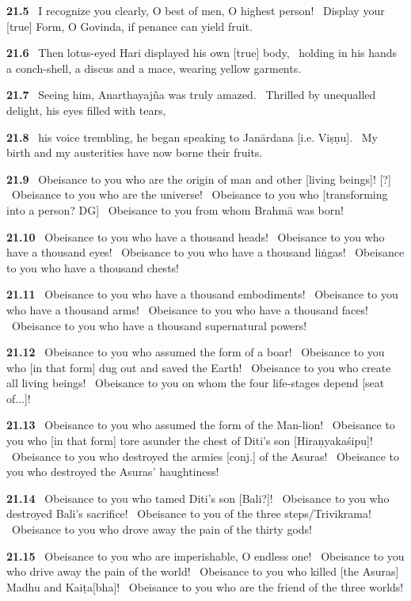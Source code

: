 \documentclass{article}
\begin{document}
\textbf{21.5}%
\ I recognize you clearly, O best of men, O highest person!%
\ Display your [true] Form, O Govinda, if penance can yield fruit.%


\textbf{21.6}%
\ Then lotus-eyed Hari displayed his own [true] body,%
\ holding in his hands a conch-shell, a discus and a mace, wearing yellow garments.%


\textbf{21.7}%
\ Seeing him, Anarthayajña was truly amazed.%
\ Thrilled by unequalled delight, his eyes filled with tears,%


\textbf{21.8}%
\ his voice trembling, he began speaking to Janārdana [i.e. Viṣṇu].%
\ My birth and my austerities have now borne their fruits.%


\textbf{21.9}%
\ Obeisance to you who are the origin of man and other [living beings]! [?]%
\ Obeisance to you who are the universe!%
\ Obeisance to you who [transforming into a person? DG]%
\ Obeisance to you from whom Brahmā was born!%


\textbf{21.10}%
\ Obeisance to you who have a thousand heads!%
\ Obeisance to you who have a thousand eyes!%
\ Obeisance to you who have a thousand liṅgas!%
\ Obeisance to you who have a thousand chests!%


\textbf{21.11}%
\ Obeisance to you who have a thousand embodiments!%
\ Obeisance to you who have a thousand arms!%
\ Obeisance to you who have a thousand faces!%
\ Obeisance to you who have a thousand supernatural powers!%


\textbf{21.12}%
\ Obeisance to you who assumed the form of a boar!%
\ Obeisance to you who [in that form] dug out and saved the Earth!%
\ Obeisance to you who create all living beings!%
\ Obeisance to you on whom the four life-stages depend [seat of...]!%


\textbf{21.13}%
\ Obeisance to you who assumed the form of the Man-lion!%
\ Obeisance to you who [in that form] tore asunder the chest of Diti's son [Hiraṇyakaśipu]!%
\ Obeisance to you who destroyed the armies [conj.] of the Asuras!%
\ Obeisance to you who destroyed the Asuras' haughtiness!%


\textbf{21.14}%
\ Obeisance to you who tamed Diti's son [Bali?]!%
\ Obeisance to you who destroyed Bali's sacrifice!%
\ Obeisance to you of the three steps/Trivikrama!%
\ Obeisance to you who drove away the pain of the thirty gods!%


\textbf{21.15}%
\ Obeisance to you who are imperishable, O endless one!%
\ Obeisance to you who drive away the pain of the world!%
\ Obeisance to you who killed [the Asuras] Madhu and Kaiṭa[bha]!%
\ Obeisance to you who are the friend of the three worlds!%
\end{document}

